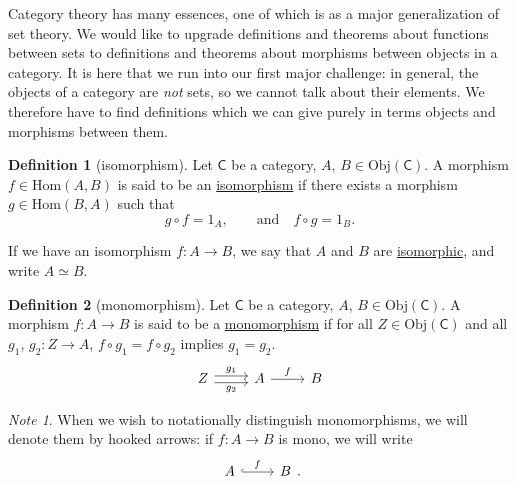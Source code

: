 \documentclass[a4paper]{report}
\newcommand{\defn}[1]{\ul{#1}}
\newcommand{\Obj}{\mathrm{Obj}}
\newcommand{\Hom}{\mathrm{Hom}}
\theoremstyle{definition}
\newtheorem{definition}{Definition}[section]
\theoremstyle{plain}
\theoremstyle{remark}
\newtheorem{note}{Note}[section]
\begin{document}
Category theory has many essences, one of which is as a major generalization of set theory. We would like to upgrade definitions and theorems about functions between sets to definitions and theorems about morphisms between objects in a category. It is here that we run into our first major challenge: in general, the objects of a category are \emph{not} sets, so we cannot talk about their elements. We therefore have to find definitions which we can give purely in terms objects and morphisms between them.
\begin{definition}[isomorphism]
  \label{def:isomorphism}
  Let $\mathsf{C}$ be a category, $A$, $B \in \Obj(\mathsf{C})$. A morphism $f \in \Hom(A,B)$ is said to be an \defn{isomorphism} if there exists a morphism $g \in \Hom(B,A)$ such that 
  \begin{equation*}
    g \circ f = 1_{A},\qquad\text{and}\quad f \circ g = 1_{B}.
  \end{equation*}

  If we have an isomorphism $f\colon A \to B$, we say that $A$ and $B$ are \defn{isomorphic}, and write $A \simeq B$.
\end{definition}

\begin{definition}[monomorphism]
  \label{def:monomorphism}
  Let $\mathsf{C}$ be a category, $A$, $B\in \Obj(\mathsf{C})$. A morphism $f\colon A \to B$ is said to be a \defn{monomorphism} if for all $Z \in \Obj(\mathsf{C})$ and all $g_{1}$, $g_{2}\colon Z \to A$, $f \circ g_{1} = f\circ g_{2}$ implies $g_{1} = g_{2}$.
  \begin{equation*}
    \begin{tikzcd}
      Z \arrow[r, shift left, "g_{1}"] \arrow[r, shift right, swap, "g_{2}"] & A \arrow[r, "f"] & B
    \end{tikzcd}
  \end{equation*}
\end{definition}

\begin{note}
  When we wish to notationally distinguish monomorphisms, we will denote them by hooked arrows: if $f\colon A \to B$ is mono, we will write
  \begin{equation*}
    \begin{tikzcd}
      A
      \arrow[r, hookrightarrow, "f"]
      & B
    \end{tikzcd}.
  \end{equation*}
\end{note}
\end{document}
